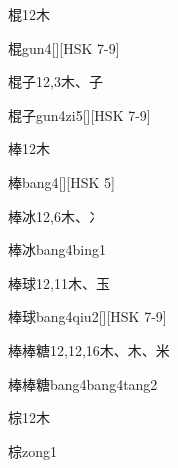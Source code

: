 \begin{Entry}{棍}{12}{⽊}
  \begin{Phonetics}{棍}{gun4}[][HSK 7-9]
  \end{Phonetics}
\end{Entry}

\begin{Entry}{棍子}{12,3}{⽊、⼦}
  \begin{Phonetics}{棍子}{gun4zi5}[][HSK 7-9]
  \end{Phonetics}
\end{Entry}

\begin{Entry}{棒}{12}{⽊}
  \begin{Phonetics}{棒}{bang4}[][HSK 5]
  \end{Phonetics}
\end{Entry}

\begin{Entry}{棒冰}{12,6}{⽊、⼎}
  \begin{Phonetics}{棒冰}{bang4bing1}
  \end{Phonetics}
\end{Entry}

\begin{Entry}{棒球}{12,11}{⽊、⽟}
  \begin{Phonetics}{棒球}{bang4qiu2}[][HSK 7-9]
  \end{Phonetics}
\end{Entry}

\begin{Entry}{棒棒糖}{12,12,16}{⽊、⽊、⽶}
  \begin{Phonetics}{棒棒糖}{bang4bang4tang2}
  \end{Phonetics}
\end{Entry}

\begin{Entry}{棕}{12}{⽊}
  \begin{Phonetics}{棕}{zong1}
  \end{Phonetics}
\end{Entry}

